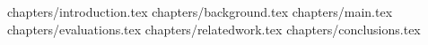 \documentclass[inscr,ack,dvipsnames]{dithesis}
\begin{document}

\frontmatter

\mainmatter

{chapters/introduction.tex}
{chapters/background.tex}
{chapters/main.tex}
{chapters/evaluations.tex}
{chapters/relatedwork.tex}
{chapters/conclusions.tex}

\backmatter
\end{document}
